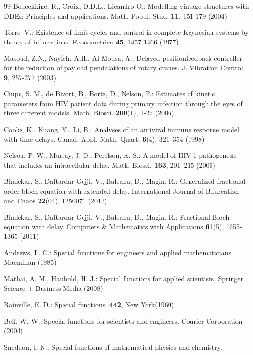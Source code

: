 \documentclass[12pt]{article}
\numberwithin{equation}{section}
\begin{document}
\begin{thebibliography}{99}
 Boucekkine, R., Croix, D.D.L., Licandro O.: Modelling vintage structures with DDEs: Principles and applications. Math. Popul. Stud. \textbf{11}, 151-179 (2004)

 Torre,  V.: Existence of limit cycles and control in complete Keynesian systems by theory of bifurcations. Econometrica \textbf{45}, 1457-1466 (1977)

 Masoud, Z.N., Nayfeh, A.H., Al-Mousa, A.: Delayed positionfeedback controller for the reduction of payload pendulations of rotary cranes. J. Vibration Control \textbf{9}, 257-277 (2003)

  Ciupe, S. M., de Bivort, B., Bortz, D., Nelson, P.: Estimates of kinetic parameters from HIV patient data during primary infection through the eyes of three different models. Math. Biosci. \textbf{200}(1), 1-27 (2006)

 Cooke, K., Kuang, Y., Li, B.: Analyses of an antiviral immune response model with time delays. Canad. Appl. Math. Quart. \textbf{6}(4), 321--354 (1998)

  Nelson, P. W.,  Murray, J. D., Perelson, A. S.: A model of HIV-1 pathogenesis that includes an intracellular delay. Math. Biosci. \textbf{163}, 201--215 (2000)

 Bhalekar, S., Daftardar-Gejji, V., Baleanu, D.,  Magin, R.: Generalized fractional order bloch equation with extended delay. International Journal of Bifurcation and Chaos \textbf{22}(04), 1250071 (2012)

 Bhalekar, S., Daftardar-Gejji, V., Baleanu, D.,  Magin, R.: Fractional Bloch equation with delay. Computers \& Mathematics with Applications \textbf{61}(5), 1355-1365  (2011)

 Andrews, L. C.: Special functions for engineers and applied mathematicians. Macmillan  (1985)

 Mathai, A. M., Haubold, H. J.: Special functions for applied scientists. Springer Science + Business Media  (2008)

 Rainville, E. D.: Special functions. \textbf{442}, New York(1960)

 Bell, W. W.: Special functions for scientists and engineers. Courier Corporation (2004)

 Sneddon, I. N.: Special functions of mathematical physics and chemistry.


\end{thebibliography}
\end{document}
